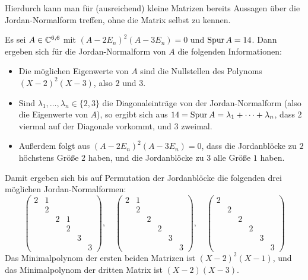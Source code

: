 \documentclass[a4paper,10pt,numbers = noenddot]{scrartcl}
\begin{document}
Hierdurch kann man für (ausreichend) kleine Matrizen bereits Aussagen über die Jordan-Nor\-mal\-form treffen, ohne die Matrix selbst zu kennen.

\begin{example}
  Es sei $A \in \mathbb{C}^{6, 6}$ mit $(A - 2E_n)^2 (A - 3E_n) = 0$ und $\operatorname{Spur} A = 14$.
  Dann ergeben sich für die Jordan-Normalform von $A$ die folgenden Informationen:
  \begin{itemize}
    \item
      Die möglichen Eigenwerte von $A$ sind die Nullstellen des Polynoms $(X-2)^2 (X-3)$, also $2$ und $3$.
    \item
      Sind $\lambda_1, \dotsc, \lambda_n \in \{2, 3\}$ die Diagonaleinträge von der Jordan-Normalform (also die Eigenwerte von $A$), so ergibt sich aus $14 = \operatorname{Spur} A = \lambda_1 + \dotsb + \lambda_n$, dass $2$ viermal auf der Diagonale vorkommt, und $3$ zweimal.
    \item
      Außerdem folgt aus $(A - 2E_n)^2 (A - 3E_n) = 0$, dass die Jordanblöcke zu $2$ höchstens Größe $2$ haben, und die Jordanblöcke zu $3$ alle Größe $1$ haben.
  \end{itemize}
  Damit ergeben sich bis auf Permutation der Jordanblöcke die folgenden drei möglichen Jordan-Normalformen:
  \[
    \begin{pmatrix}
      2 & 1 &   &   &   &   \\
        & 2 &   &   &   &   \\
        &   & 2 & 1 &   &   \\
        &   &   & 2 &   &   \\
        &   &   &   & 3 &   \\
        &   &   &   &   & 3
    \end{pmatrix},
    \quad
    \begin{pmatrix}
      2 & 1 &   &   &   &   \\
        & 2 &   &   &   &   \\
        &   & 2 &   &   &   \\
        &   &   & 2 &   &   \\
        &   &   &   & 3 &   \\
        &   &   &   &   & 3
    \end{pmatrix},
    \quad
    \begin{pmatrix}
      2 &   &   &   &   &   \\
        & 2 &   &   &   &   \\
        &   & 2 &   &   &   \\
        &   &   & 2 &   &   \\
        &   &   &   & 3 &   \\
        &   &   &   &   & 3
    \end{pmatrix}
  \]
  Das Minimalpolynom der ersten beiden Matrizen ist $(X-2)^2 (X-1)$, und das Minimalpolynom der dritten Matrix ist $(X-2)(X-3)$.
\end{example}
\end{document}
